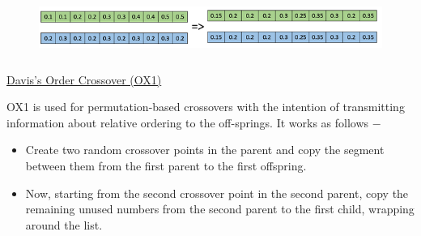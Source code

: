 \documentclass[12pt]{article}
\renewcommand{\_}{\kern-1.5pt\textunderscore\kern-1.5pt}
\begin{document}
\begin{enumerate}
\begin{adjustwidth}{0.03in}{0.03in}
\end{adjustwidth}




\begin{figure}[H]
	\begin{Center}
		\includegraphics[width=6.25in,height=0.76in]{./media/image15.png}
	\end{Center}
\end{figure}



\setlength{\parskip}{0.0pt}
\par


\vspace{\baselineskip}
\setlength{\parskip}{7.2pt}
\begin{adjustwidth}{0.03in}{0.03in}
\begin{justify}
{\fontsize{14pt}{16.8pt}\selectfont \uline{Davis’s Order Crossover (OX1)}\par}
\end{justify}\par

\end{adjustwidth}

\begin{adjustwidth}{0.03in}{0.03in}
\begin{justify}
OX1 is used for permutation-based crossovers with the intention of transmitting information about relative ordering to the off-springs. It works as follows $-$ 
\end{justify}\par

\end{adjustwidth}

\begin{itemize}
	\item Create two random crossover points in the parent and copy the segment between them from the first parent to the first offspring.\par

	\item Now, starting from the second crossover point in the second parent, copy the remaining unused numbers from the second parent to the first child, wrapping around the list.\par


\end{itemize}
\end{enumerate}
\end{document}
